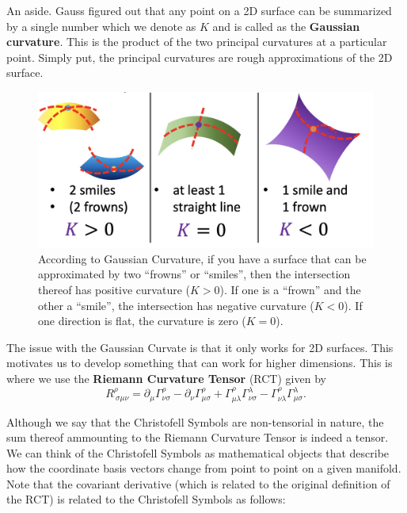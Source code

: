 \documentclass[a4paper,11pt]{article}
\begin{document}
 An aside. Gauss figured out that any point on a 2D surface can be summarized by a single number which
 we denote as $K$ and is called as the \textbf{Gaussian curvature}. This is the product of the two principal curvatures
 at a particular point. Simply put, the principal curvatures are rough approximations of the 2D surface.
\begin{figure}[H]
\centering
\def\imgwidth{0.65\linewidth}
\includegraphics[width=\imgwidth]{pasted-images/primordial-cosmological-perturbations-00-21-20.png}
\caption{According to Gaussian Curvature, if you have a surface that can be approximated
by two “frowns” or “smiles”, then the intersection thereof has positive curvature ($K>0$).
If one is a “frown” and the other a “smile”, the intersection has negative curvature ($K<0$).
If one direction is flat, the curvature is zero ($K=0$).}
\label{fig:gaussian-curvature}
\end{figure}
The issue with the Gaussian Curvate is that it only works for 2D surfaces. This motivates
us to develop something that can work for higher dimensions. This is where we use the \textbf{Riemann Curvature Tensor} (RCT) given by
\begin{equation}
    R^\rho_{\ \sigma\mu\nu} = \partial_\mu \Gamma^\rho_{\nu\sigma} - \partial_\nu \Gamma^\rho_{\mu\sigma} + \Gamma^\rho_{\mu\lambda} \Gamma^\lambda_{\nu\sigma} - \Gamma^\rho_{\nu\lambda} \Gamma^\lambda_{\mu\sigma}.
    \label{riemann-curvature-tensor}
\end{equation}

Although we say that the Christofell Symbols are non-tensorial in nature, the 
sum thereof ammounting to the Riemann Curvature Tensor is indeed a tensor. 
We can think of the Christofell Symbols as mathematical objects that describe how the 
coordinate basis vectors change from point to point on a given manifold. Note that
the covariant derivative (which is related to the original definition of the RCT) is related
to the Christofell Symbols as follows:
\end{document}
